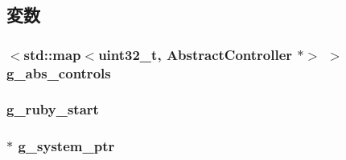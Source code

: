 \subsection{変数}
\hypertarget{Global_8hh_a69048389e2ba94f365456cd57622cba4}{
\subsubsection[{g\_\-abs\_\-controls}]{$<$std::map$<${\bf uint32\_\-t}, {\bf AbstractController} $\ast$$>$ $>$ {\bf g\_\-abs\_\-controls}}}
\label{Global_8hh_a69048389e2ba94f365456cd57622cba4}
\hypertarget{Global_8hh_aa69be22cc9024a302f0883584fe87eea}{
\subsubsection[{g\_\-ruby\_\-start}]{ {\bf g\_\-ruby\_\-start}}}
\label{Global_8hh_aa69be22cc9024a302f0883584fe87eea}
\hypertarget{Global_8hh_ac7631ed7c7cc138c40a9e88e38d0ecb1}{
\subsubsection[{g\_\-system\_\-ptr}]{$\ast$ {\bf g\_\-system\_\-ptr}}}
\label{Global_8hh_ac7631ed7c7cc138c40a9e88e38d0ecb1}
